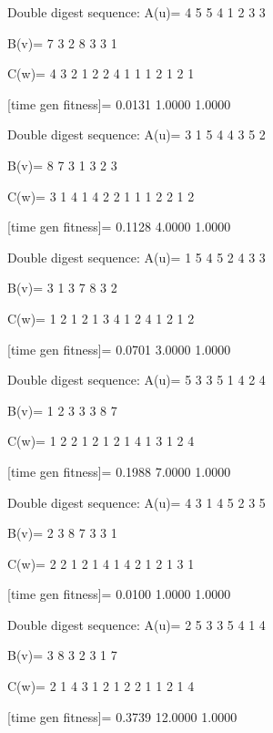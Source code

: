 Double digest sequence:
A(u)=
     4     5     5     4     1     2     3     3

B(v)=
     7     3     2     8     3     3     1

C(w)=
     4     3     2     1     2     2     4     1     1     1     2     1     2     1

[time gen fitness]=
    0.0131    1.0000    1.0000

Double digest sequence:
A(u)=
     3     1     5     4     4     3     5     2

B(v)=
     8     7     3     1     3     2     3

C(w)=
     3     1     4     1     4     2     2     1     1     1     2     2     1     2

[time gen fitness]=
    0.1128    4.0000    1.0000

Double digest sequence:
A(u)=
     1     5     4     5     2     4     3     3

B(v)=
     3     1     3     7     8     3     2

C(w)=
     1     2     1     2     1     3     4     1     2     4     1     2     1     2

[time gen fitness]=
    0.0701    3.0000    1.0000

Double digest sequence:
A(u)=
     5     3     3     5     1     4     2     4

B(v)=
     1     2     3     3     3     8     7

C(w)=
     1     2     2     1     2     1     2     1     4     1     3     1     2     4

[time gen fitness]=
    0.1988    7.0000    1.0000

Double digest sequence:
A(u)=
     4     3     1     4     5     2     3     5

B(v)=
     2     3     8     7     3     3     1

C(w)=
     2     2     1     2     1     4     1     4     2     1     2     1     3     1

[time gen fitness]=
    0.0100    1.0000    1.0000

Double digest sequence:
A(u)=
     2     5     3     3     5     4     1     4

B(v)=
     3     8     3     2     3     1     7

C(w)=
     2     1     4     3     1     2     1     2     2     1     1     2     1     4

[time gen fitness]=
    0.3739   12.0000    1.0000

